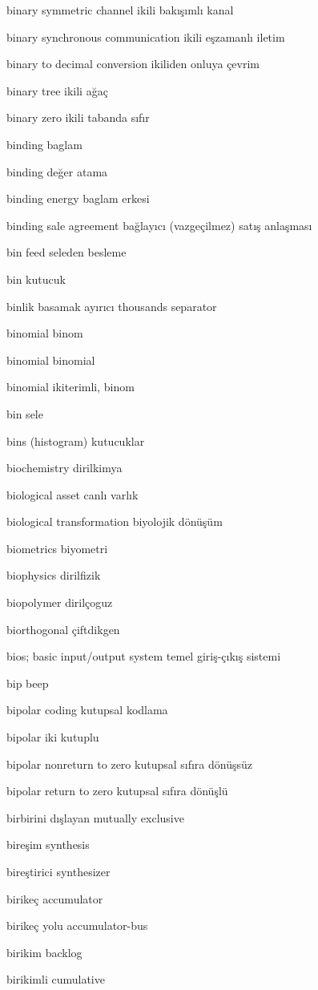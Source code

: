 \documentclass[12pt,fleqn]{article}\usepackage{../../common}
\begin{document}
binary symmetric channel ikili bakışımlı kanal

binary synchronous communication ikili eşzamanlı iletim

binary to decimal conversion ikiliden onluya çevrim

binary tree ikili ağaç

binary zero ikili tabanda sıfır

binding baglam

binding değer atama

binding energy baglam erkesi

binding sale agreement bağlayıcı (vazgeçilmez) satış anlaşması

bin feed seleden besleme

bin kutucuk

binlik basamak ayırıcı thousands separator

binomial binom

binomial binomial

binomial ikiterimli, binom

bin sele

bins (histogram) kutucuklar

biochemistry dirilkimya

biological asset canlı varlık

biological transformation biyolojik dönüşüm

biometrics biyometri

biophysics dirilfizik

biopolymer dirilçoguz

biorthogonal çiftdikgen

bios; basic input/output system temel giriş-çıkış sistemi

bip beep

bipolar coding kutupsal kodlama

bipolar iki kutuplu

bipolar nonreturn to zero kutupsal sıfıra dönüşsüz

bipolar return to zero kutupsal sıfıra dönüşlü

birbirini dışlayan mutually exclusive

bireşim synthesis

bireştirici synthesizer

birikeç accumulator

birikeç yolu accumulator-bus

birikim backlog

birikimli cumulative
\end{document}
